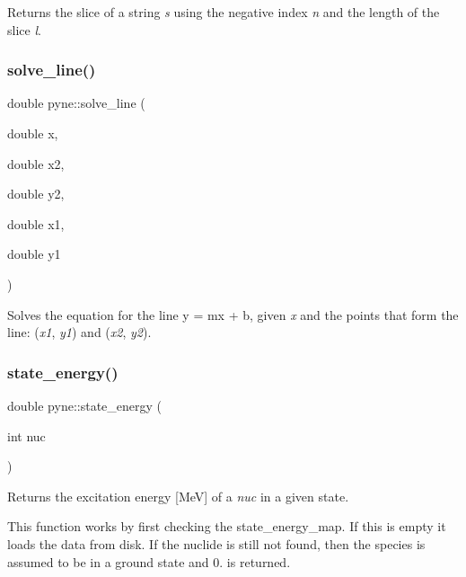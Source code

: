 Returns the slice of a string {\itshape s} using the negative index {\itshape n} and the length of the slice {\itshape l}. \mbox{\label{namespacepyne_a943fe41cf25ff550684aabffe5971e1e}} 
\subsubsection{\texorpdfstring{solve\+\_\+line()}{solve\_line()}}
{\footnotesize\ttfamily double pyne\+::solve\+\_\+line (\begin{DoxyParamCaption}\item[{double}]{x,  }\item[{double}]{x2,  }\item[{double}]{y2,  }\item[{double}]{x1,  }\item[{double}]{y1 }\end{DoxyParamCaption})}

Solves the equation for the line y = mx + b, given {\itshape x} and the points that form the line\+: ({\itshape x1}, {\itshape y1}) and ({\itshape x2}, {\itshape y2}). \mbox{\label{namespacepyne_ada1a23281a3a62267fbd355bd48da2e6}} 
\subsubsection{\texorpdfstring{state\+\_\+energy()}{state\_energy()}}
{\footnotesize\ttfamily double pyne\+::state\+\_\+energy (\begin{DoxyParamCaption}\item[{int}]{nuc }\end{DoxyParamCaption})}



Returns the excitation energy \mbox{[}MeV\mbox{]} of a {\itshape nuc} in a given state. 

This function works by first checking the state\+\_\+energy\+\_\+map. If this is empty it loads the data from disk. If the nuclide is still not found, then the species is assumed to be in a ground state and 0. is returned. \mbox{\label{namespacepyne_aa02f7d3ceda305d11379f2f778e4d645}} 
